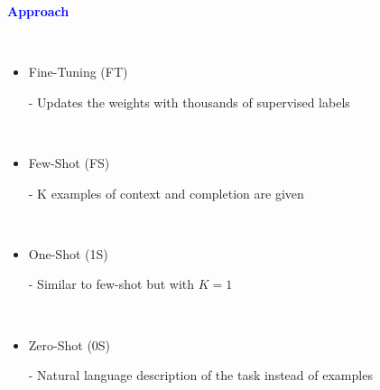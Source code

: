 \documentclass[professionalfont]{beamer}
\begin{document}
\begin{frame}

\begin{center}
    { \textbf{\textcolor{blue}{ {\fontsize{12}{14}\selectfont Approach } }} }
\end{center}
\\[0.5cm]

{\fontsize{10}{14}\selectfont 
\begin{itemize}
    \item Fine-Tuning (FT)

    - Updates the weights with thousands of supervised labels
    
    \\[0.3cm]
    
    \item Few-Shot (FS)

    - K examples of context and completion are given
    
    \\[0.3cm]

    \item One-Shot (1S)

    - Similar to few-shot but with \( K = 1 \)
    
    \\[0.3cm]

    \item Zero-Shot (0S)

    - Natural language description of the task instead of examples
    
    \\[0.3cm]
\end{itemize}
}

\end{frame}
\end{document}
